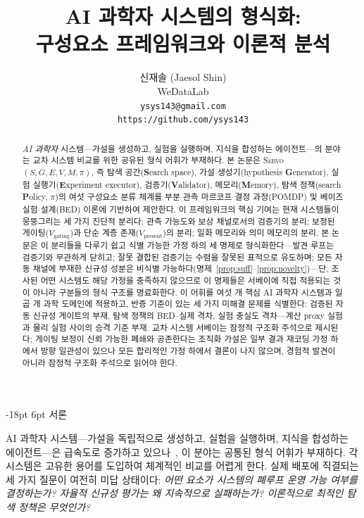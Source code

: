 \documentclass[11pt]{article}
\title{\textbf{AI 과학자 시스템의 형식화:\\
구성요소 프레임워크와 이론적 분석}}
\author{%
  신재솔 (Jaesol Shin) \\
  WeDataLab \\
  \texttt{ysys143@gmail.com} \\
  \texttt{https://github.com/ysys143}
}
\date{}
\makeatletter
\renewcommand\section{\@startsection{section}{1}{\z@}%
  {-18pt \@plus -4pt \@minus -2pt}%
  {6pt \@plus 2pt}%
  {\normalfont\large\bfseries}}
\newcommand{\sgmvpi}{$(S, G, E, V, M, \pi)$}
\newcommand{\framework}{\textsc{Servo}}
\makeatother
\begin{document}
\maketitle

\begin{abstract}
\emph{AI 과학자} 시스템---가설을 생성하고, 실험을 실행하며, 지식을 합성하는 에이전트---의 분야는 교차 시스템 비교를 위한 공유된 형식 어휘가 부재하다. 본 논문은 \framework{} \sgmvpi{}, 즉 탐색 공간(\textbf{S}earch space), 가설 생성기(hypothesis \textbf{G}enerator), 실험 실행기(\textbf{E}xperiment executor), 검증기(\textbf{V}alidator), 메모리(\textbf{M}emory), 탐색 정책(search \textbf{P}olicy, $\pi$)의 여섯 구성요소 분류 체계를 부분 관측 마르코프 결정 과정(POMDP) 및 베이즈 실험 설계(BED) 이론에 기반하여 제안한다. 이 프레임워크의 핵심 기여는 현재 시스템들이 뭉뚱그리는 세 가지 진단적 분리다: 관측 가능도와 보상 채널로서의 검증기의 분리; 보정된 게이팅($V_\text{gating}$)과 단순 계층 존재($V_\text{present}$)의 분리; 일화 메모리와 의미 메모리의 분리. 본 논문은 이 분리들을 다루기 쉽고 식별 가능한 가정 하의 세 명제로 형식화한다---발견 루프는 검증기와 무관하게 닫히고; 잘못 결합된 검증기는 수렴을 잘못된 표적으로 유도하며; 모든 자동 채널에 부재한 신규성 성분은 비식별 가능하다(명제~\ref{prop:suff}--\ref{prop:novelty})---단, 조사된 어떤 시스템도 해당 가정을 충족하지 않으므로 이 명제들은 서베이에 직접 적용되는 것이 아니라 구분들의 형식 구조를 명료화한다. 이 어휘를 여섯 개 핵심 AI 과학자 시스템과 일곱 개 과학 도메인에 적용하고, 반증 기준이 있는 세 가지 미해결 문제를 식별한다: 검증된 자동 신규성 게이트의 부재, 탐색 정책의 BED--실제 격차, 실험 충실도 격차---계산 proxy 실험과 물리 실험 사이의 승격 기준 부재. 교차 시스템 서베이는 잠정적 구조화 주석으로 제시된다; 게이팅 보정이 신뢰 가능한 폐쇄와 공존한다는 조직화 가설은 일부 결과 재코딩 가정 하에서 방향 일관성이 있으나 모든 합리적인 가정 하에서 결론이 나지 않으며, 경험적 발견이 아니라 잠정적 구조화 주석으로 읽어야 한다.
\end{abstract}

\section{서론}

AI 과학자 시스템---가설을 독립적으로 생성하고, 실험을 실행하며, 지식을 합성하는 에이전트---은 급속도로 증가하고 있으나~\citep{boiko2023emergent,lu2024aiscientist,lu2026aiscientist,google2026aletheia,liu2026lasthuman}, 이 분야는 공통된 형식 어휘가 부재하다. 각 시스템은 고유한 용어를 도입하여 체계적인 비교를 어렵게 한다. 실제 배포에 직결되는 세 가지 질문이 여전히 미답 상태이다: \textit{어떤 요소가 시스템의 폐루프 운영 가능 여부를 결정하는가? 자율적 신규성 평가는 왜 지속적으로 실패하는가? 이론적으로 최적인 탐색 정책은 무엇인가?}
\end{document}
